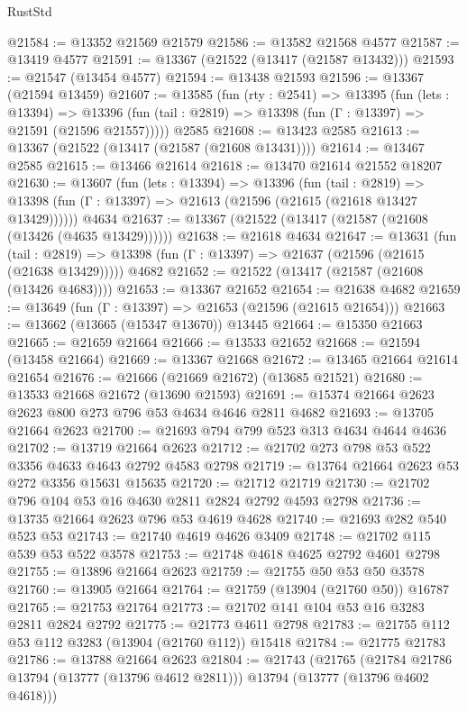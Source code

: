 \begin{lexlean}{RustStd}
\begin{coremodule}
@21584 := @13352 @21569 @21579
@21586 := @13582 @21568 @4577
@21587 := @13419 @4577
@21591 := @13367 (@21522 (@13417 (@21587 @13432)))
@21593 := @21547 (@13454 @4577)
@21594 := @13438 @21593
@21596 := @13367 (@21594 @13459)
@21607 := @13585
    (fun (rty : @2541) =>
    @13395
      (fun (lets : @13394) =>
      @13396 (fun (tail : @2819) => @13398 (fun (Γ : @13397) => @21591 (@21596 @21557)))))
    @2585
@21608 := @13423 @2585
@21613 := @13367 (@21522 (@13417 (@21587 (@21608 @13431))))
@21614 := @13467 @2585
@21615 := @13466 @21614
@21618 := @13470 @21614 @21552 @18207
@21630 := @13607
    (fun (lets : @13394) =>
    @13396
      (fun (tail : @2819) =>
      @13398 (fun (Γ : @13397) => @21613 (@21596 (@21615 (@21618 @13427 @13429))))))
    @4634
@21637 := @13367 (@21522 (@13417 (@21587 (@21608 (@13426 (@4635 @13429))))))
@21638 := @21618 @4634
@21647 := @13631
    (fun (tail : @2819) => @13398 (fun (Γ : @13397) => @21637 (@21596 (@21615 (@21638 @13429)))))
    @4682
@21652 := @21522 (@13417 (@21587 (@21608 (@13426 @4683))))
@21653 := @13367 @21652
@21654 := @21638 @4682
@21659 := @13649 (fun (Γ : @13397) => @21653 (@21596 (@21615 @21654)))
@21663 := @13662 (@13665 (@15347 @13670)) @13445
@21664 := @15350 @21663
@21665 := @21659 @21664
@21666 := @13533 @21652
@21668 := @21594 (@13458 @21664)
@21669 := @13367 @21668
@21672 := @13465 @21664 @21614 @21654
@21676 := @21666 (@21669 @21672) (@13685 @21521)
@21680 := @13533 @21668 @21672 (@13690 @21593)
@21691 := @15374 @21664 @2623 @2623 @800 @273 @796 @53 @4634 @4646 @2811 @4682
@21693 := @13705 @21664 @2623
@21700 := @21693 @794 @799 @523 @313 @4634 @4644 @4636
@21702 := @13719 @21664 @2623
@21712 := @21702 @273 @798 @53 @522 @3356 @4633 @4643 @2792 @4583 @2798
@21719 := @13764 @21664 @2623 @53 @272 @3356 @15631 @15635
@21720 := @21712 @21719
@21730 := @21702 @796 @104 @53 @16 @4630 @2811 @2824 @2792 @4593 @2798
@21736 := @13735 @21664 @2623 @796 @53 @4619 @4628
@21740 := @21693 @282 @540 @523 @53
@21743 := @21740 @4619 @4626 @3409
@21748 := @21702 @115 @539 @53 @522 @3578
@21753 := @21748 @4618 @4625 @2792 @4601 @2798
@21755 := @13896 @21664 @2623
@21759 := @21755 @50 @53 @50 @3578
@21760 := @13905 @21664
@21764 := @21759 (@13904 (@21760 @50)) @16787
@21765 := @21753 @21764
@21773 := @21702 @141 @104 @53 @16 @3283 @2811 @2824 @2792
@21775 := @21773 @4611 @2798
@21783 := @21755 @112 @53 @112 @3283 (@13904 (@21760 @112)) @15418
@21784 := @21775 @21783
@21786 := @13788 @21664 @2623
@21804 := @21743
    (@21765
      (@21784 @21786 @13794 (@13777 (@13796 @4612 @2811)))
      @13794
      (@13777 (@13796 @4602 @4618)))

\end{coremodule}
\end{lexlean}
